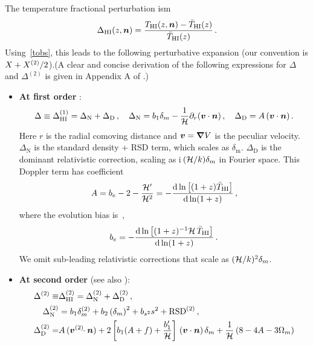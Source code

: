 The temperature fractional perturbation ism
\begin{equation}
\Delta_{{\mathrm{HI}}}(z,\bm {n}) = \frac{T_{{\mathrm{HI}}}(z,\bm {n}) - \bar{T}_{{\mathrm{HI}}} (z)}{\bar{T}_{{\mathrm{HI}}} (z)}\,.\label{e1.1_02}
\end{equation}
Using~\eqref{tobs}, this leads to the following perturbative expansion (our convention is $X+X^{{(2)}}/2$).(A clear and concise derivation of the following expressions for $\Delta$ and $\Delta^{(2)}$ is given in Appendix A of \cite{DiDio:2018zmk}.)
\begin{itemize}
\item 
{\bfseries At first order} \cite{Hall:2012wd}:
\begin{equation} \label{dt1}
\Delta \equiv \Delta^{(1)}_{{\mathrm{HI}}} = \Delta_\mathrm{N} + \Delta_\mathrm{D}\,,\quad  \Delta_\mathrm{N} = b_1\delta_m - \frac{1}{\mathcal{H}} \partial_r(\bm{v}\cdot\bm {n} )\,,\quad \Delta_\mathrm{D}=A\,(\bm{v}\cdot\bm {n} ) \,.
\end{equation}
Here $r$ is the radial comoving distance and $\bm{v}=\bm{\nabla}V$ is the peculiar velocity.
$ \Delta_\mathrm{N}$ is the standard density + RSD term, which scales as $\delta_\mathrm{m}$. $\Delta_\mathrm{D}$ is the dominant relativistic correction, scaling as i\,$(\mathcal{H}/k)\delta_m$ in Fourier space. This Doppler term has coefficient
\begin{equation}
A = b_e - 2 - \frac{\mathcal{H}'}{\mathcal{H}^{2}}= -\frac{\mathrm{d} \ln \left[(1+z) \bar{T}_{{\mathrm{HI}}} \right]}{\mathrm{d} \ln (1+z)} \,,
 \label{eq:AcoeffTrel}
\end{equation}
where the evolution bias is~\cite{Fonseca:2015laa},
\begin{equation}
b_e = -\frac{\mathrm{d} \ln \left[(1+z)^{-1}\mathcal{H}\, \bar{T}_{{\mathrm{HI}}} \right]}{\mathrm{d} \ln (1+z)}\,.
\end{equation}
We omit sub-leading relativistic corrections that scale as $(\mathcal{H}/k)^2\delta_m$. 
%
%
\item
{\bfseries At second order}
\cite{Maartens:2019yhx} (see also \cite{Umeh:2015gza,DiDio:2015bua,Umeh:2016thy,Clarkson:2018dwn,DiDio:2018zmk}):
\begin{align}
\Delta^{\tw} \equiv& \Delta^{(2)}_{\hi} = \Delta^{\tw}_\mathrm{N} + \Delta^{\tw}_\mathrm{D} \,,\\
\Delta^{\tw}_\mathrm{N}&= b_1\delta_m^{\tw}+b_2 \left(\delta_m \right)^2+ b_{s^2}s^2 + \mathrm{RSD}^{\tw}\,,
\label{d2n} \\
\Delta^{\tw}_\mathrm{D} =& A\, (\v^{(2)}\!\!\cdot\n)+2\left[ b_{1} (A+f) + \frac{b_1'}{\cH}\right]\,(\v\cdot\n)\,\delta_m +\frac{1}{\cH}\left( 8 - 4 A-3 \Omega_m \right) \nonumber \\

\end{align}
\end{itemize}
